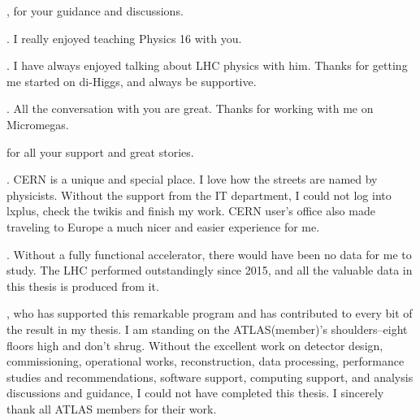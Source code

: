 

, for your guidance and discussions.

. I really enjoyed teaching Physics 16 with you.

. I have always enjoyed talking about LHC physics with him. Thanks for getting me started on di-Higgs, and always be supportive.

. All the conversation with you are great. Thanks for working with me on Micromegas.

 for all your support and great stories.

. CERN is a unique and special place. I love how the streets are named by physicists. Without the support from the IT department, I could not log into lxplus, check the twikis and finish my work. CERN user's office also made traveling to Europe a much nicer and easier experience for me. 

. Without a fully functional accelerator, there would have been no data for me to study. The LHC performed outstandingly since 2015, and all the valuable data in this thesis is produced from it. 

, who has supported this remarkable program and has contributed to every bit of the result in my thesis. I am standing on the ATLAS(member)'s shoulders--eight floors high and don't shrug. Without the excellent work on detector design, commissioning, operational works, reconstruction, data processing, performance studies and recommendations, software support, computing support, and analysis discussions and guidance, I could not have completed this thesis. I sincerely thank all ATLAS members for their work.

